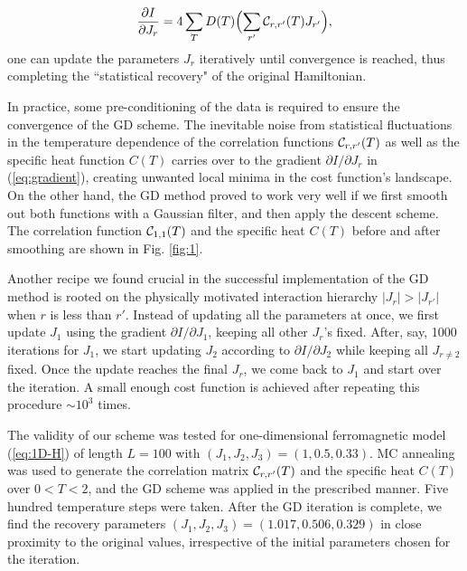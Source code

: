 \documentclass[reprint,amsmath,amssymb,aps,showpacs,superscriptaddress,prb]{revtex4-1}
\newcommand{\ba}{\begin{eqnarray}}
\newcommand{\ea}{\end{eqnarray}}
\begin{document}
\ba {\partial I \over \partial J_r } = 4 \sum_T D (T) \Bigl( \sum_{r'} {\cal C}_{r,r'} (T) J_{r'} \Bigr) ,  \label{eq:gradient} \ea
one can update the parameters $J_r$ iteratively until convergence is reached, thus completing the ``statistical recovery" of the original Hamiltonian.

In practice, some pre-conditioning of the data is required to ensure the convergence of the GD scheme. The inevitable noise from statistical fluctuations in the temperature dependence of the correlation functions ${\cal C}_{r,r'} (T)$ as well as the specific heat function $C(T)$  carries over to the gradient $\partial I/\partial J_r$ in (\ref{eq:gradient}), creating unwanted local minima in the cost function's landscape. On the other hand, the GD method proved to work very well if we first smooth out both functions with a Gaussian filter, and then apply the descent scheme. The correlation function ${\cal C}_{1,1}(T)$ and the specific heat $C(T)$ before and after smoothing are shown in Fig. \ref{fig:1}.

Another recipe we found crucial in the successful implementation of the GD method is rooted on the physically motivated interaction hierarchy $|J_r | > |J_{r'}|$ when $r$ is less than $r'$.
Instead of updating all the parameters at once, we first update $J_1$ using the gradient $\partial I/\partial J_1$, keeping all other $J_r$'s fixed. After, say, 1000 iterations for $J_1$, we start updating $J_2$ according to $\partial I/\partial J_2$ while keeping all $J_{r\neq 2}$ fixed. Once the update reaches the final $J_r$, we come back to $J_1$ and start over the iteration. A small enough cost function is achieved after repeating this procedure $\sim 10^3$ times.

The validity of our scheme was tested for one-dimensional ferromagnetic model (\ref{eq:1D-H}) of length $L=100$ with $(J_1, J_2, J_3) = (1, 0.5, 0.33)$. MC annealing was used to generate the correlation matrix ${\cal C}_{r,r'}(T)$ and the specific heat $C(T)$ over $0< T< 2$, and the GD scheme was applied in the prescribed manner. Five hundred temperature steps were taken. After the GD iteration is complete, we find the recovery parameters $(J_1, J_2, J_3 ) = (1.017, 0.506, 0.329)$ in close proximity to the original values, irrespective of the initial parameters chosen for the iteration.
\end{document}
